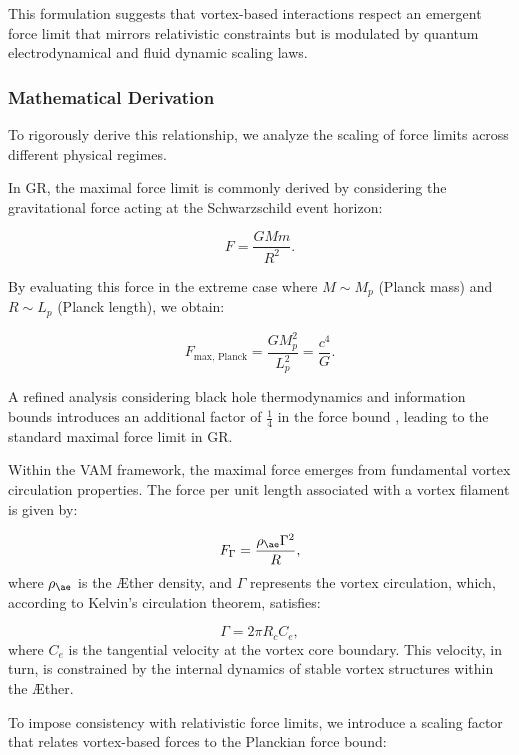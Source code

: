 This formulation suggests that vortex-based interactions respect an emergent force limit that mirrors relativistic constraints but is modulated by quantum electrodynamical and fluid dynamic scaling laws.


\subsubsection*{Mathematical Derivation}
To rigorously derive this relationship, we analyze the scaling of force limits across different physical regimes.


In GR, the maximal force limit is commonly derived by considering the gravitational force acting at the Schwarzschild event horizon:


\begin{equation*}
F = \frac{GMm}{R^2}.
\end{equation*}


By evaluating this force in the extreme case where $M \sim M_p$ (Planck mass) and $R \sim L_p$ (Planck length), we obtain:


\begin{equation*}
F_{\text{max, Planck}} = \frac{G M_p^2}{L_p^2} = \frac{c^4}{G}.
\end{equation*}


A refined analysis considering black hole thermodynamics and information bounds introduces an additional factor of $\frac{1}{4}$ in the force bound \cite{Gibbons2002}, leading to the standard maximal force limit in GR.


Within the VAM framework, the maximal force emerges from fundamental vortex circulation properties. The force per unit length associated with a vortex filament is given by:


\begin{equation*}
F_{\Gamma} = \frac{\rho_{\ae} \Gamma^2}{R},
\end{equation*}
where $\rho_{\ae}$ is the \AE ther density, and $\Gamma$ represents the vortex circulation, which, according to Kelvin’s circulation theorem, satisfies:


\begin{equation*}
\Gamma = 2\pi R_c C_e,
\end{equation*}
where $C_e$ is the tangential velocity at the vortex core boundary. This velocity, in turn, is constrained by the internal dynamics of stable vortex structures within the \AE ther.


To impose consistency with relativistic force limits, we introduce a scaling factor that relates vortex-based forces to the Planckian force bound:


